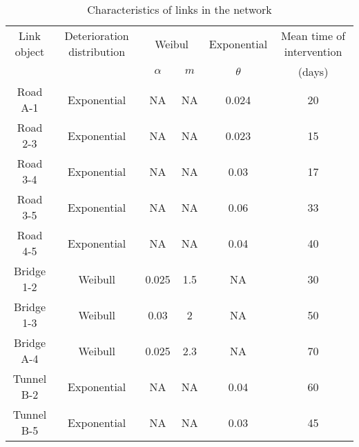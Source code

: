 \begin{table}[h]
\caption{Characteristics of links in the network}
\begin{tabular}{|l|l|l|l|l|l|}
\hline
\multicolumn{1}{|c|}{Link object} & \multicolumn{1}{c|}{Deterioration distribution} & \multicolumn{2}{c|}{Weibul} & \multicolumn{1}{c|}{Exponential} & \multicolumn{1}{c|}{Mean time of intervention} \\ 
\cline{3-4}
\multicolumn{1}{|c|}{} & \multicolumn{1}{c|}{} & \multicolumn{1}{c|}{$\alpha$} & \multicolumn{1}{c|}{$m$} & \multicolumn{1}{c|}{$\theta$} & \multicolumn{1}{c|}{(days)} \\ 
\hline
\multicolumn{1}{|c|}{Road A-1} & \multicolumn{1}{c|}{Exponential} & \multicolumn{1}{c|}{NA} & \multicolumn{1}{c|}{NA} & \multicolumn{1}{c|}{0.024} & \multicolumn{1}{c|}{20} \\ 
\hline
\multicolumn{1}{|c|}{Road 2-3} & \multicolumn{1}{c|}{Exponential} & \multicolumn{1}{c|}{NA} & \multicolumn{1}{c|}{NA} & \multicolumn{1}{c|}{0.023} & \multicolumn{1}{c|}{15} \\ 
\hline
\multicolumn{1}{|c|}{Road 3-4} & \multicolumn{1}{c|}{Exponential} & \multicolumn{1}{c|}{NA} & \multicolumn{1}{c|}{NA} & \multicolumn{1}{c|}{0.03} & \multicolumn{1}{c|}{17} \\ 
\hline
\multicolumn{1}{|c|}{Road 3-5} & \multicolumn{1}{c|}{Exponential} & \multicolumn{1}{c|}{NA} & \multicolumn{1}{c|}{NA} & \multicolumn{1}{c|}{0.06} & \multicolumn{1}{c|}{33} \\ 
\hline
\multicolumn{1}{|c|}{Road 4-5} & \multicolumn{1}{c|}{Exponential} & \multicolumn{1}{c|}{NA} & \multicolumn{1}{c|}{NA} & \multicolumn{1}{c|}{0.04} & \multicolumn{1}{c|}{40} \\ 
\hline
\multicolumn{1}{|c|}{Bridge 1-2} & \multicolumn{1}{c|}{Weibull} & \multicolumn{1}{c|}{0.025} & \multicolumn{1}{c|}{1.5} & \multicolumn{1}{c|}{NA} & \multicolumn{1}{c|}{30} \\ 
\hline
\multicolumn{1}{|c|}{Bridge 1-3} & \multicolumn{1}{c|}{Weibull} & \multicolumn{1}{c|}{0.03} & \multicolumn{1}{c|}{2} & \multicolumn{1}{c|}{NA} & \multicolumn{1}{c|}{50} \\ 
\hline
\multicolumn{1}{|c|}{Bridge A-4} & \multicolumn{1}{c|}{Weibull} & \multicolumn{1}{c|}{0.025} & \multicolumn{1}{c|}{2.3} & \multicolumn{1}{c|}{NA} & \multicolumn{1}{c|}{70} \\ 
\hline
\multicolumn{1}{|c|}{Tunnel B-2} & \multicolumn{1}{c|}{Exponential} & \multicolumn{1}{c|}{NA} & \multicolumn{1}{c|}{NA} & \multicolumn{1}{c|}{0.04} & \multicolumn{1}{c|}{60} \\ 
\hline
\multicolumn{1}{|c|}{Tunnel B-5} & \multicolumn{1}{c|}{Exponential} & \multicolumn{1}{c|}{NA} & \multicolumn{1}{c|}{NA} & \multicolumn{1}{c|}{0.03} & \multicolumn{1}{c|}{45} \\ 
\hline
\end{tabular}
\label{tblavaimain:11}
\end{table}

